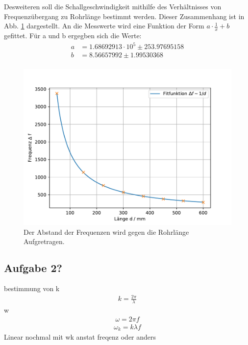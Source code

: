 \FloatBarrier
Desweiteren soll die Schallgeschwindigkeit mithilfe des Verhältnisses von Frequenzübergang zu Rohrlänge bestimmt werden.
Dieser Zusammenhang ist in Abb. \ref{fig.1/x} dargestellt.
An die Messwerte wird eine Funktion der Form $a\cdot\frac{1}{x}+b$ gefittet.
Für a und b ergegben sich die Werte:
\begin{align*}
  a&=1.68692913\cdot10^5\pm253.97695158\\
  b&=8.56657992\pm1.99530368\\
\end{align*}
\begin{figure}[h!]
  \centering
  \includegraphics[width=\textwidth]{geschi.pdf}
  \caption{Der Abstand der Frequenzen wird gegen die Rohrlänge Aufgretragen.}
  \label{fig.1/x}
\end{figure}

\subsection{Aufgabe 2?}
bestimmung von k
\begin{align*}
  k= \frac{2\pi}{\lambda}
\end{align*}
w
\begin{align*}
  \omega=2\pi f
\end{align*}
\begin{align*}
  \omega_k=k\lambda f
\end{align*}
Linear nochmal mit wk anstat freqenz oder anders
